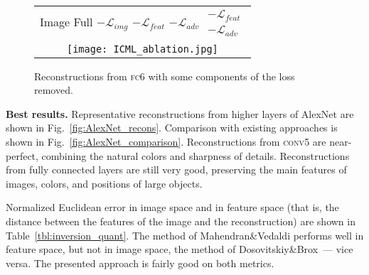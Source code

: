 \documentclass{article}
\newcommand{\conv}{\textsc{conv}}
\newcommand{\fc}{\textsc{fc}}
\newcommand{\loss}{\mathcal{L}}
\newcommand{\featloss}{\loss_{feat}}
\newcommand{\discrloss}{\loss_{adv}}
\newcommand{\pixloss}{\loss_{img}}
\begin{document}
\begin{figure}
\begin{center}
\setlength{\tabcolsep}{0.1cm}
\renewcommand{\arraystretch}{1}
\small{
  \begin{tabular}{c}
  \;\;Image \quad\;\; Full \quad\; $-\pixloss$ \;\;\; $-\featloss$ \; $-\discrloss$  $\begin{array} {lcl} -\featloss \\ -\discrloss \end{array}$  \\
  \texttt{[image: ICML\_ablation.jpg]}\\
   \end{tabular}}
\end{center}
   \caption{Reconstructions from \fc6 with some components of the loss removed.}
\label{fig:ablation}
\end{figure}

\textbf{Best results.}
Representative reconstructions from higher layers of AlexNet are shown in Fig.~\ref{fig:AlexNet_recons}.
Comparison with existing approaches is shown in Fig.~\ref{fig:AlexNet_comparison}.
Reconstructions from \conv5 are near-perfect, combining the natural colors and sharpness of details.
Reconstructions from fully connected layers are still very good, preserving the main features of images, colors, and positions of large objects.

Normalized Euclidean error in image space and in feature space (that is, the distance between the features of the image and the reconstruction) are shown in Table~\ref{tbl:inversion_quant}. 
The method of Mahendran\&Vedaldi performs well in feature space, but not in image space,
the method of Dosovitskiy\&Brox~--- vice versa.
The presented approach is fairly good on both metrics.
\end{document}
